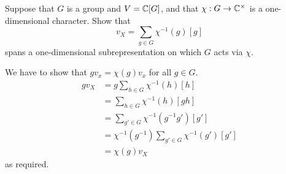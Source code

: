 
\question Suppose that $G$ is a group and $V = \mathbb C[G]$, and that $\chi: G \to \mathbb C^\times$ is a one-dimensional character. Show that
\[ v_X = \sum_{g \in G} \chi^{-1}(g)[g] \]
spans a one-dimensional subrepresentation on which $G$ acts via $\chi$. 
\begin{solution}
    We have to show that $gv_x = \chi(g)v_x$ for all $g \in G$. 
    \begin{align*}
        gv_X
        &= g \sum_{h \in G} \chi^{-1}(h)[h] \\
        &= \sum_{h \in G} \chi^{-1}(h)[gh] \\
        &= \sum_{g' \in G} \chi^{-1}(g^{-1}g')[g'] \\
        &= \chi^{-1}(g^{-1}) \sum_{g' \in G} \chi^{-1}(g')[g'] \\
        &= \chi(g) v_X
    \end{align*}
    as required. 
\end{solution}

